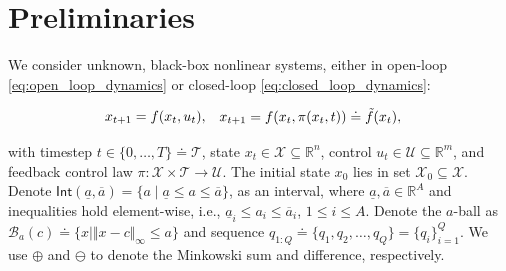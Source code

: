\documentclass{l4dc2026}
\begin{document}
\section{Preliminaries}
\label{preliminary}
We consider unknown, black-box nonlinear systems, either in open-loop \eqref{eq:open_loop_dynamics} or closed-loop \eqref{eq:closed_loop_dynamics}:

\vspace{-20pt}
\begin{subequations}
\begin{align}
    x_{t+1} &= f(x_t, u_t),
    \label{eq:open_loop_dynamics}
\end{align}

\vspace{-30pt}
\begin{align}
    x_{t+1} &= f(x_t, \pi(x_t, t)) \doteq \tilde f(x_t),
    \label{eq:closed_loop_dynamics}
\end{align}
\end{subequations}
\vspace{-20pt}

\noindent with timestep $t \in \{0, \dots, T\} \doteq \mathcal{T}$, state $x_t \in \mathcal{X} \subseteq \mathbb{R}^n$, control $u_t \in \mathcal{U} \subseteq \mathbb{R}^m$, and feedback control law $\pi: \mathcal{X} \times \mathcal{T} \rightarrow \mathcal{U}$. The initial state $x_0$ lies in set $\mathcal{X}_0 \subseteq \mathcal{X}$. Denote $\textsf{Int}(\underline{a}, \overline{a}) = \{a \mid \underline{a} \le a \le \overline{a}\}$, as an interval, where $\underline{a}, \overline{a} \in \mathbb{R}^A$ and inequalities hold element-wise, i.e., $\underline{a}_i \le a_i \le \overline{a}_i$, $1 \le i \le A$. Denote the $a$-ball as $\mathcal{B}_a(c) \doteq \{ x \mid \Vert x - c \Vert_\infty \le a\}$ and sequence $q_{1:Q} \doteq \{q_1, q_2, \ldots, q_Q\} = \{q_i\}_{i=1}^Q$. We use $\oplus$ and $\ominus$ to denote the Minkowski sum and difference, respectively. 

\end{document}
